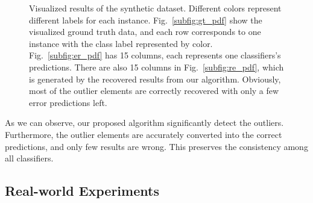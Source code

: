 \documentclass[letterpaper]{article} %
\begin{document}
\begin{figure}[ht]
\center
{}
\caption{Visualized results of the synthetic dataset.
Different colors represent different labels for each instance. 
Fig.~\ref{subfig:gt_pdf} show the visualized ground truth data, and each row corresponds to one instance with the class label represented by color.
Fig.~\ref{subfig:er_pdf} has 15 columns, each represents one classifiers's predictions.
There are also 15 columns in Fig.~\ref{subfig:re_pdf}, which is generated by the recovered results from our algorithm.
Obviously, most of the outlier elements are correctly recovered with only a few error predictions left.
}
\label{fig:ensemble_cluster}
\end{figure}

As we can observe, our proposed algorithm significantly detect the outliers.
Furthermore, the outlier elements are accurately converted into the correct predictions, and only few results are wrong.
This preserves the consistency among all classifiers.


\subsection{Real-world Experiments}
\end{document}
